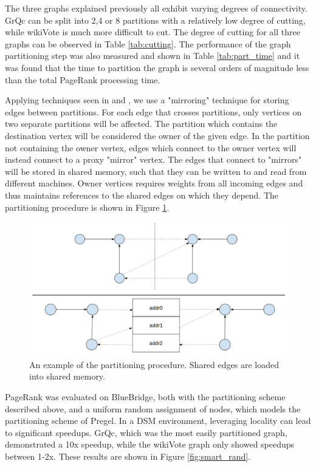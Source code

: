 The three graphs explained previously all exhibit varying degrees of 
connectivity. GrQc can be split into 2,4 or 8 partitions with a relatively low
degree of cutting, while wikiVote is much more difficult to cut. The degree of
cutting for all three graphs can be observed in Table \ref{tab:cutting}. 
The performance of the graph partitioning step was also measured and shown in
Table \ref{tab:part_time} and it was found that the time to partition the graph
is several orders of magnitude less than the total PageRank processing time.

Applying techniques seen in \cite{Chen:2015:powerlyra}
and \cite{Tian:2013:thinklikeagraph}, we use a "mirroring" technique for storing
edges between partitions. For each edge that crosses partitions, only vertices
on two separate partitions will be affected. The partition which contains the 
destination vertex will be considered the owner of the given edge. In the
partition not containing the owner vertex, edges which connect to the owner
vertex will instead connect to a proxy "mirror" vertex. The edges that connect
to "mirrors" will be stored in shared memory, such that they can be written to
and read from different machines. Owner vertices requires weights from all
incoming edges and thus maintains references to the shared edges on which they
depend. The partitioning procedure is shown in Figure \ref{fig:partition}.

\begin{figure}[h]
\includegraphics[width=\linewidth]{"fig/partition_example"}
\caption{An example of the partitioning procedure. Shared edges are loaded into
shared memory.}
\label{fig:partition}
\end{figure}

PageRank was evaluated on BlueBridge, both with the partitioning scheme
described above, and a uniform random assignment of nodes, which models the
partitioning scheme of Pregel. In a DSM environment, leveraging locality can
lead to significant speedups. GrQc, which was the most easily partitioned graph,
demonstrated a 10x speedup, while the wikiVote graph only showed speedups
between 1-2x. These results are shown in Figure \ref{fig:smart_rand}.

